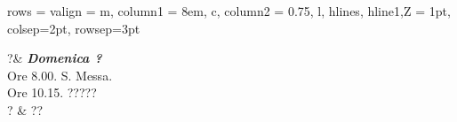 
\vspace*{\fill}
\small

\begin{center}
\begin{tblr}
{
    rows = {valign = m},
    column{1} = {8em, c},
    column{2} = {0.75\textwidth, l},
    hlines,
    hline{1,Z} = {1pt},
    colsep=2pt,
    rowsep=3pt
}

?&
{
{\large\textbf{\textit{Domenica ?}}}\\
Ore 8.00. S. Messa.\\
Ore 10.15. ?????
}
\\
?
&
{
??
}

\end{tblr}

\end{center}


\normalsize
